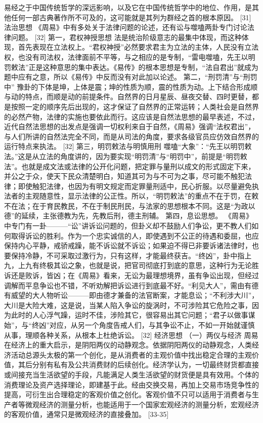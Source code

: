 \documentclass[a4paper,12pt,UTF8,twoside]{ctexbook}
\begin{document}
易经之于中国传统哲学的深远影响，以及它在中国传统哲学中的地位、作用，是其他任何一部古典著作所不可及的，这可能就是其列为群经之首的根本原因。 [31]
法治思想
《周易》中有多处关于法律问题的论述，还有讼与噬嗑两卦专门讨论法律问题。 [32]
第一，君权神授思想
法是统治阶级意志的最集中体现，而这种体现，首先表现在立法权上。“君权神授”必然要求君主为立法的主体，人民没有立法权，也没有司法权，法律面前不平等，与之相应的是专制，“雷电噬嗑，先王以明罚敕法”正是这种意思的集中表达。《易传》的根本思想是专制，“法自君出”就成为题中应有之意，所以《易传》中反而没有对此加以论述。
第二，“刑罚清”与“刑罚中”
豫卦的下体是坤，上体是震；坤的性质为顺，震的性质为动。上下结合形成顺与动的特点，而顺是动的前提条件。自然界的日月星辰、昼夜交替、四时更替，都是按照一定的顺序先后出现的，这才保证了自然界的正常运转；人类社会是自然界的必然产物，法律的实施也要依此而行。这应该是自然法思想的最早表述，不过，近代自然法思想的出发点是强调一切权利来自于自然，《周易》强调“法权君出”，与人们所讲的自然法完全不同，而是从司法的角度，要求各级官员应仿效自然界的运行特点来执法。 [32]
第三，明罚敕法与明慎用刑
噬嗑“大象”：“先王以明罚敕法。”这是从立法的角度讲的，因为要实现“明罚清”与“明罚中”，前提是“明罚敕法”。也就是成文法或法律的公开化问题，把定罪与量刑以成文的形式固定下来，并公之于众，使天下民众清楚明白，知道其可为与不可为之事，尽可能不触犯法律；即使触犯法律，也因为有明文规定而定罪量刑适中，民心折服。以尽量避免执法者的主观随意性，显示法律的公正性。所以，“明罚敕法”的重点不在于罚，在敕不在法；在于育民教民，不在于制民刑民，与法家的思想根本不同。这是“为政以德”的延续，主张德教为先，先教后刑，德主刑辅。
第四，息讼思想。
《周易》中专门有一卦———“讼”讲诉讼问题的，但卦义却不鼓励人们争讼，更不教人们如何取得诉讼的胜利。作为一个忠实诚信的人，即使遇到不公正的待遇和委屈，也应保持内心平静，戒骄戒躁，能不诉讼就不诉讼；如果迫不得已非要诉诸法律时，也要保持冷静，不可采取过激行为，只有这样，才能最终获吉。“终凶”，卦中指上九，上九有终极其讼之象，也就是说，把官司彻底打到底的意思，这种行为无论胜诉还是败诉，皆凶；在《周易》看来，无讼为最理想境界，虽有争讼出现，但经过调解而平息争讼也不错，不听劝解把诉讼进行到底最不好。“利见大人”，需由有德有威望的大人物听讼———即由德才兼备的法官断案，才能息讼；“不利涉大川”，大川是大险大难，这是说，当某人陷入争讼的旋涡时，不可涉险其它危险之事，因为此时的人心浮气躁，运时不佳，涉险其它，很容易出其它问题；“君子以做事谋始”，与“终凶”对应，从另一个角度告戒人们，与其争讼不止，不如一开始就谨慎从事，理顺各种关系，从根本上杜绝诉讼。 [32]
经济思想
（一）两仪与经济
周易在经济上的重大启示，是阴阳两仪的动静观念。依据阴阳两仪的动静观念，人类经济活动总源头太极的第一个创化，是从消费者的主观价值中找出稳定合理的主观价值，其后分别有私有及公共消费财的后续创化。经济学认为，一切最终财货都直接或间接充当生活欲望的手段，凡能满足人类生活欲望的财货便是具有效用。个体的消费理论及资产选择理论，即建基于此。经由交换交易，再加上交易市场竞争性的提高，可衍生出合理稳定的客观价值之创化。客观价值不只可以适用于消费者与生产者等微观经济的测量分析，也能适用于一个国家宏观经济的测量分析，宏观经济的客观价值，通常只是微观经济的直接叠加。 [33-35]
\end{document}
